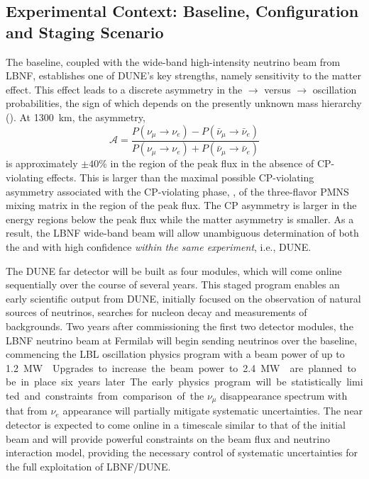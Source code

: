 \subsection{Experimental Context: Baseline, Configuration and Staging Scenario}

The  baseline, coupled with the wide-band
high-intensity neutrino beam from LBNF, establishes one of DUNE's key
strengths, namely sensitivity to the matter effect. This effect leads to a
discrete asymmetry in the \numu $\to$ \nue versus \anumu $\to$ \anue
oscillation probabilities, the sign of which depends on the presently
unknown mass hierarchy ().  At \SI{1300}{\km}, the asymmetry,
\begin{equation}
\mathcal{A} = \frac{ P(\nu_\mu \rightarrow \nu_e)-P(\bar{\nu}_\mu \rightarrow \bar{\nu}_e)}{P(\nu_\mu \rightarrow \nu_e)+P(\bar{\nu}_\mu \rightarrow \bar{\nu}_e)}
\end{equation}
is approximately $\pm 40\%$ in the region of the peak flux in the
absence of CP-violating effects. This is larger than the maximal
possible CP-violating asymmetry associated with the CP-violating
phase, \deltacp, of the three-flavor PMNS mixing matrix in the region of
the peak flux. The CP asymmetry is larger in the energy regions below the peak
flux while the matter asymmetry is smaller. As a result, the LBNF
wide-band beam will allow unambiguous determination of both the  and
\deltacp with high confidence \textit{within the same experiment}, i.e., DUNE.   

The DUNE far detector will be built as four  modules, which will
come online sequentially over the course of several years. 
This staged program enables an early scientific output from DUNE, 
initially focused on the observation of natural
sources of neutrinos, searches for nucleon decay and 
measurements of backgrounds. 
Two years after commissioning the first two detector modules, 
the LBNF neutrino
beam at Fermilab will  
begin sending neutrinos over the 
baseline, commencing the LBL oscillation physics program with a beam power of up to \SI{1.2}\MW{}. Upgrades to increase the beam power to \SI{2.4}\MW{} are planned to be in place six years later.
The early physics program
will be statistically limited and constraints from comparison of the $\nu_\mu$
disappearance spectrum with that from $\nu_e$ appearance will partially mitigate systematic uncertainties. The near detector is expected to come online in a timescale similar to that of the initial beam and will provide powerful constraints on the beam flux and neutrino interaction model, providing the
necessary control of systematic uncertainties for the full exploitation of LBNF/DUNE. 

